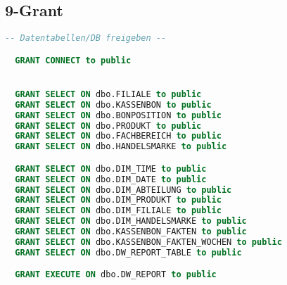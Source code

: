 \subsection{9-Grant}

\begin{lstlisting}[language=SQL]
  -- Datentabellen/DB freigeben --

  GRANT CONNECT to public


  GRANT SELECT ON dbo.FILIALE to public
  GRANT SELECT ON dbo.KASSENBON to public
  GRANT SELECT ON dbo.BONPOSITION to public
  GRANT SELECT ON dbo.PRODUKT to public
  GRANT SELECT ON dbo.FACHBEREICH to public
  GRANT SELECT ON dbo.HANDELSMARKE to public

  GRANT SELECT ON dbo.DIM_TIME to public
  GRANT SELECT ON dbo.DIM_DATE to public
  GRANT SELECT ON dbo.DIM_ABTEILUNG to public
  GRANT SELECT ON dbo.DIM_PRODUKT to public
  GRANT SELECT ON dbo.DIM_FILIALE to public
  GRANT SELECT ON dbo.DIM_HANDELSMARKE to public
  GRANT SELECT ON dbo.KASSENBON_FAKTEN to public
  GRANT SELECT ON dbo.KASSENBON_FAKTEN_WOCHEN to public
  GRANT SELECT ON dbo.DW_REPORT_TABLE to public

  GRANT EXECUTE ON dbo.DW_REPORT to public
\end{lstlisting}
\newpage

